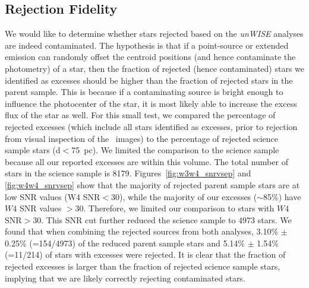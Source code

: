   \subsection{Rejection Fidelity}
  
    We would like to determine whether stars rejected based on the \textit{unWISE} analyses are indeed contaminated. The hypothesis is that if a point-source or extended emission can randomly offset the centroid positions (and hence contaminate the photometry) of a star, then the fraction of rejected (hence contaminated) stars we identified as excesses should be higher than the fraction of rejected stars in the parent sample. This is because if a contaminating source is bright enough to influence the photocenter of the star, it is most likely able to increase the excess flux of the star as well. For this small test, we compared the percentage of rejected excesses (which include all stars identified as excesses, prior to rejection from visual inspection of the \WS\ images) to the percentage of rejected science sample stars (d$<$75~pc). We limited the comparison to the science sample because all our reported excesses are within this volume. The total number of stars in the science sample is 8179. Figures~\ref{fig:w3w4_snrvsep} and \ref{fig:w4w4_snrvsep} show that the majority of rejected parent sample stars are at low SNR values (W4 SNR$<30$), while the majority of our excesses ($\sim$85\%) have $W4$ SNR values $>30$. Therefore, we limited our comparison to stars with $W4$ SNR$>30$. This SNR cut further reduced the science sample to 4973 stars. We found that when combining the rejected sources from both analyses, 3.10\% $\pm$ 0.25\% (=154/4973) of the reduced parent sample stars and 5.14\% $\pm$ 1.54\% (=11/214) of stars with excesses were rejected. It is clear that the fraction of rejected excesses is larger than the fraction of rejected science sample stars, implying that we are likely correctly rejecting contaminated stars. 
    
